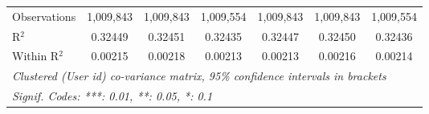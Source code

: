 \begin{table}[htbp]
\begin{threeparttable}[b]
\begin{tabular}{lcccccc}
         Observations                   & 1,009,843       & 1,009,843       & 1,009,554       & 1,009,843       & 1,009,843       & 1,009,554\\  
         R$^2$                          & 0.32449         & 0.32451         & 0.32435         & 0.32447         & 0.32450         & 0.32436\\  
         Within R$^2$                   & 0.00215         & 0.00218         & 0.00213         & 0.00213         & 0.00216         & 0.00214\\  
         \midrule \midrule
         \multicolumn{7}{l}{\emph{Clustered (User id) co-variance matrix, 95\% confidence intervals in brackets}}\\
         \multicolumn{7}{l}{\emph{Signif. Codes: ***: 0.01, **: 0.05, *: 0.1}}\\
      \end{tabular}
   \end{threeparttable}
\end{table}


